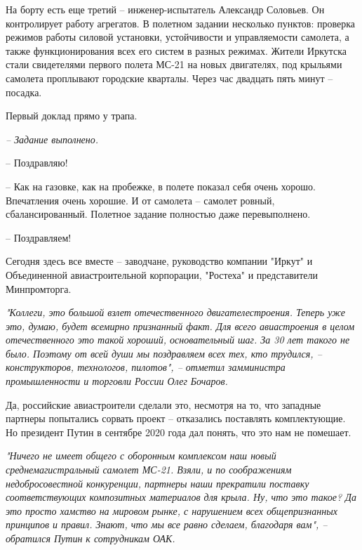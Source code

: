 На борту есть еще третий – инженер-испытатель Александр Соловьев. Он контролирует работу агрегатов. В полетном задании несколько пунктов: проверка режимов работы силовой установки, устойчивости и управляемости самолета, а также функционирования всех его систем в разных режимах. Жители Иркутска стали свидетелями первого полета МС-21 на новых двигателях, под крыльями самолета проплывают городские кварталы. Через час двадцать пять минут – посадка.

Первый доклад прямо у трапа.

\begingroup
\em – Задание выполнено.

– Поздравляю!

– Как на газовке, как на пробежке, в полете показал себя очень хорошо. Впечатления очень хорошие. И от самолета – самолет ровный, сбалансированный. Полетное задание полностью даже перевыполнено.

– Поздравляем!

\endgroup

Сегодня здесь все вместе – заводчане, руководство компании "Иркут" и
Объединенной авиастроительной корпорации, "Ростеха" и представители
Минпромторга.

\begin{leftbar}
	\begingroup
		\em "Коллеги, это большой взлет отечественного двигателестроения. Теперь
				уже это, думаю, будет всемирно признанный факт. Для всего авиастроения
				в целом отечественного это такой хороший, основательный шаг. За 30 лет
				такого не было. Поэтому от всей души мы поздравляем всех тех, кто
				трудился, – конструкторов, технологов, пилотов", – отметил замминистра
				промышленности и торговли России Олег Бочаров.
	\endgroup
\end{leftbar}

Да, российские авиастроители сделали это, несмотря на то, что западные партнеры
попытались сорвать проект – отказались поставлять комплектующие. Но президент
Путин в сентябре 2020 года дал понять, что это нам не помешает.

\begin{leftbar}
	\begingroup
		\em "Ничего не имеет общего с оборонным комплексом наш новый
				среднемагистральный самолет МС-21. Взяли, и по соображениям
				недобросовестной конкуренции, партнеры наши прекратили поставку
				соответствующих композитных материалов для крыла. Ну, что это такое? Да
				это просто хамство на мировом рынке, с нарушением всех общепризнанных
				принципов и правил. Знают, что мы все равно сделаем, благодаря вам", –
				обратился Путин к сотрудникам ОАК.
	\endgroup
\end{leftbar}

